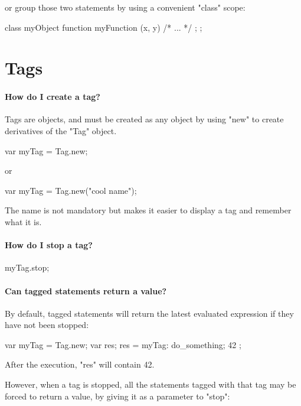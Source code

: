 or group those two statements by using a convenient "class" scope:

\begin{urbifixme}
class myObject {
  function myFunction (x, y) { /* ... */ };
};
\end{urbifixme}

\section{Tags}

\paragraph{How do I create a tag?}


Tags are objects, and must be created as any object by using "new" to create
derivatives of the "Tag" object.

\begin{urbifixme}
var myTag = Tag.new;
\end{urbifixme}

or

\begin{urbifixme}
var myTag = Tag.new("cool name");
\end{urbifixme}

The name is not mandatory but makes it easier to display a tag and remember
what it is.

\paragraph{How do I stop a tag?}
\begin{urbifixme}
myTag.stop;
\end{urbifixme}

\paragraph{Can tagged statements return a value?}
By default, tagged statements will return the latest evaluated expression if
they have not been stopped:

\begin{urbifixme}
var myTag = Tag.new;
var res;
res = { myTag: { do_something; 42 } };
\end{urbifixme}

After the execution, "res" will contain 42.

However, when a tag is stopped, all the statements tagged with that tag may
be forced to return a value, by giving it as a parameter to "stop":

